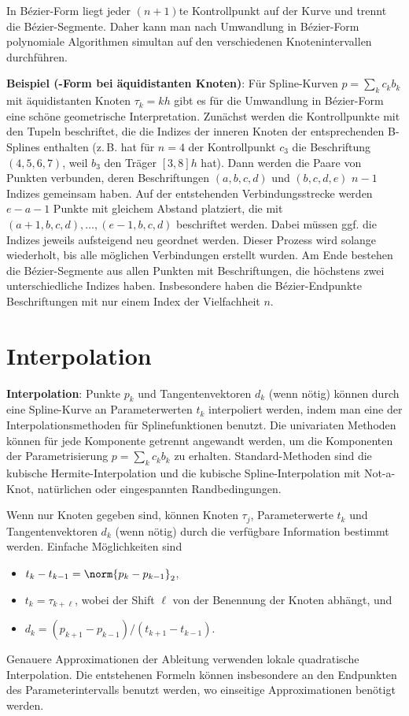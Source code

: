In Bézier-Form liegt jeder $(n + 1)$te Kontrollpunkt auf der Kurve und trennt die Bézier-Segmente.
Daher kann man nach Umwandlung in Bézier-Form polynomiale Algorithmen simultan auf den
verschiedenen Knotenintervallen durchführen.

\linie
\pagebreak

\textbf{Beispiel (-Form bei äquidistanten Knoten)}:
Für Spline-Kurven $p = \sum_k c_k b_k$ mit äquidistanten Knoten $\tau_k = kh$ gibt es
für die Umwandlung in Bézier-Form eine schöne geometrische Interpretation.
Zunächst werden die Kontrollpunkte mit den Tupeln beschriftet, die die Indizes der inneren Knoten
der entsprechenden B-Splines enthalten (z.\,B. hat für $n = 4$ der Kontrollpunkt
$c_3$ die Beschriftung $(4, 5, 6, 7)$, weil $b_3$ den Träger $[3, 8]h$ hat).
Dann werden die Paare von Punkten verbunden, deren Beschriftungen $(a, b, c, d)$ und
$(b, c, d, e)$ $n - 1$ Indizes gemeinsam haben.
Auf der entstehenden Verbindungsstrecke werden $e - a - 1$ Punkte mit gleichem Abstand platziert,
die mit $(a + 1, b, c, d), \dotsc, (e - 1, b, c, d)$ beschriftet werden.
Dabei müssen ggf. die Indizes jeweils aufsteigend neu geordnet werden.
Dieser Prozess wird solange wiederholt, bis alle möglichen Verbindungen erstellt wurden.
Am Ende bestehen die Bézier-Segmente aus allen Punkten mit Beschriftungen, die höchstens
zwei unterschiedliche Indizes haben.
Insbesondere haben die Bézier-Endpunkte Beschriftungen mit nur einem Index der Vielfachheit $n$.

\section{%
    Interpolation%
}

\textbf{Interpolation}:
Punkte $p_k$ und Tangentenvektoren $d_k$ (wenn nötig) können durch eine
Spline-Kurve an Parameterwerten $t_k$ interpoliert werden, indem man eine der
Interpolationsmethoden für Splinefunktionen benutzt.
Die univariaten Methoden können für jede Komponente getrennt angewandt werden,
um die Komponenten der Parametrisierung $p = \sum_k c_k b_k$ zu erhalten.
Standard-Methoden sind die kubische Hermite-Interpolation und die kubische Spline-Interpolation
mit Not-a-Knot, natürlichen oder eingespannten Randbedingungen.

Wenn nur Knoten gegeben sind, können Knoten $\tau_j$, Parameterwerte $t_k$ und
Tangentenvektoren $d_k$ (wenn nötig) durch die verfügbare Information bestimmt werden.
Einfache Möglichkeiten sind
\begin{itemize}
    \item
    $t_k - t_{k-1} = \norm{p_k - p_{k-1}}_2$,

    \item
    $t_k = \tau_{k+\ell}$, wobei der Shift $\ell$ von der Benennung der Knoten abhängt, und

    \item
    $d_k = (p_{k+1} - p_{k-1}) / (t_{k+1} - t_{k-1})$.
\end{itemize}
Genauere Approximationen der Ableitung verwenden lokale quadratische Interpolation.
Die entstehenen Formeln können insbesondere an den Endpunkten des Parameterintervalls benutzt
werden, wo einseitige Approximationen benötigt werden.

